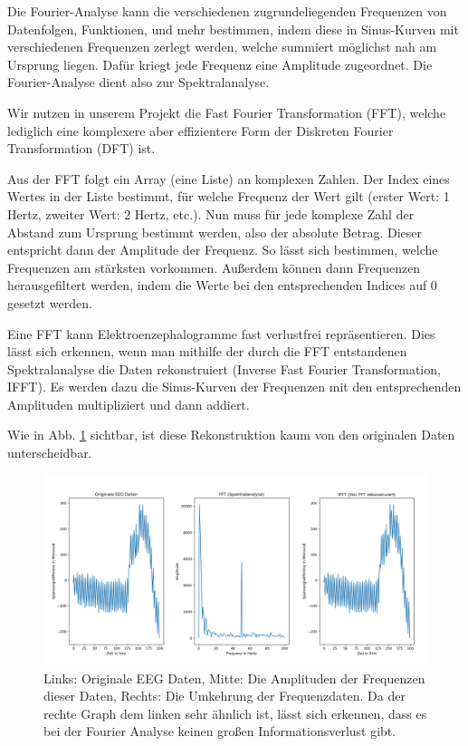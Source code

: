 \documentclass[10pt]{article}
\begin{document}
Die Fourier-Analyse kann die verschiedenen zugrundeliegenden Frequenzen von Datenfolgen, Funktionen, und mehr bestimmen, indem diese in Sinus-Kurven mit verschiedenen Frequenzen zerlegt werden, welche summiert möglichst nah am Ursprung liegen. 
Dafür kriegt jede Frequenz eine Amplitude zugeordnet.
Die Fourier-Analyse dient also zur Spektralanalyse.

Wir nutzen in unserem Projekt die Fast Fourier Transformation (FFT), welche lediglich eine komplexere aber effizientere Form der Diskreten Fourier Transformation (DFT) ist.

Aus der FFT folgt ein Array (eine Liste) an komplexen Zahlen. 
Der Index eines Wertes in der Liste bestimmt, für welche Frequenz der Wert gilt (erster Wert: 1 Hertz, zweiter Wert: 2 Hertz, etc.). Nun muss für jede komplexe Zahl der Abstand zum Ursprung bestimmt werden, also der absolute Betrag. 
Dieser entspricht dann der Amplitude der Frequenz. So lässt sich bestimmen, welche Frequenzen am stärksten vorkommen. Außerdem können dann Frequenzen herausgefiltert werden, indem die Werte bei den entsprechenden Indices auf 0 gesetzt werden. 

Eine FFT kann Elektroenzephalogramme fast verlustfrei repräsentieren. 
Dies lässt sich erkennen, wenn man mithilfe der durch die FFT entstandenen Spektralanalyse die Daten rekonstruiert (Inverse Fast Fourier Transformation, IFFT). 
Es werden dazu die Sinus-Kurven der Frequenzen mit den entsprechenden Amplituden multipliziert und dann addiert.

Wie in Abb. \ref{fig:ifft} sichtbar, ist diese Rekonstruktion kaum von den originalen Daten unterscheidbar. %

\begin{figure}[h!]
    \centering
    \includegraphics[width=\linewidth]{pictures/blink_fft_ifft.png}
    \caption{Links: Originale EEG Daten, Mitte: Die Amplituden der Frequenzen dieser Daten, Rechts: Die Umkehrung der Frequenzdaten. Da der rechte Graph dem linken sehr ähnlich ist, lässt sich erkennen, dass es bei der Fourier Analyse keinen großen Informationsverlust gibt.}
    \label{fig:ifft}
\end{figure}
\end{document}

